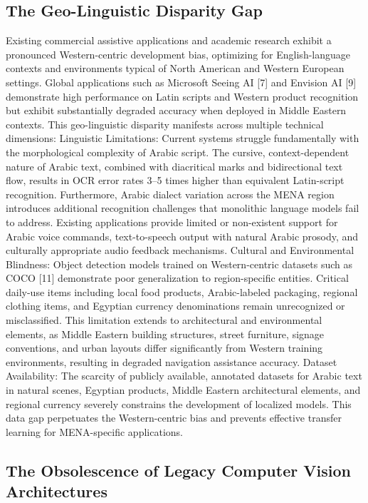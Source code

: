 \documentclass[12pt,a4paper]{report}
\begin{document}
\subsection{The Geo-Linguistic Disparity Gap}

Existing commercial assistive applications and academic research exhibit a pronounced Western-centric development bias, optimizing for English-language contexts and environments typical of North American and Western European settings. Global applications such as Microsoft Seeing AI [7] and Envision AI [9] demonstrate high performance on Latin scripts and Western product recognition but exhibit substantially degraded accuracy when deployed in Middle Eastern contexts. This geo-linguistic disparity manifests across multiple technical dimensions: Linguistic Limitations: Current systems struggle fundamentally with the morphological complexity of Arabic script. The cursive, context-dependent nature of Arabic text, combined with diacritical marks and bidirectional text flow, results in OCR error rates 3--5 times higher than equivalent Latin-script recognition. Furthermore, Arabic dialect variation across the MENA region introduces additional recognition challenges that monolithic language models fail to address. Existing applications provide limited or non-existent support for Arabic voice commands, text-to-speech output with natural Arabic prosody, and culturally appropriate audio feedback mechanisms. Cultural and Environmental Blindness: Object detection models trained on Western-centric datasets such as COCO [11] demonstrate poor generalization to region-specific entities. Critical daily-use items including local food products, Arabic-labeled packaging, regional clothing items, and Egyptian currency denominations remain unrecognized or misclassified. This limitation extends to architectural and environmental elements, as Middle Eastern building structures, street furniture, signage conventions, and urban layouts differ significantly from Western training environments, resulting in degraded navigation assistance accuracy. Dataset Availability: The scarcity of publicly available, annotated datasets for Arabic text in natural scenes, Egyptian products, Middle Eastern architectural elements, and regional currency severely constrains the development of localized models. This data gap perpetuates the Western-centric bias and prevents effective transfer learning for MENA-specific applications.

\subsection{The Obsolescence of Legacy Computer Vision Architectures}
\end{document}
